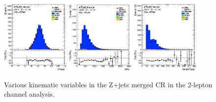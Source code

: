 \begin{figure}[ht]
 \centering
   \includegraphics[width=0.30\textwidth]{figures/2lep/reweighting/after_reweighting/C_0ptag1pfat0pjet_0ptv_CRVjet_llMass_Lin.eps}
   \includegraphics[width=0.30\textwidth]{figures/2lep/reweighting/after_reweighting/C_0ptag1pfat0pjet_0ptv_CRVjet_MllJ_Lin.eps}
   \includegraphics[width=0.30\textwidth]{figures/2lep/reweighting/after_reweighting/C_0ptag1pfat0pjet_0ptv_CRVjet_fatJetMass_Lin.eps}
    \caption{ Various kinematic variables in the Z+jets merged CR in the 2-lepton channel analysis.}
    \label{fig:2lep_zjets_merged_CR}
\end{figure}


